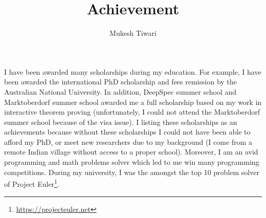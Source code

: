 \documentclass[a4paper]{article}
\title{Achievement}
\author{Mukesh Tiwari}
\date{}
\begin{document}
\fontsize{12}{15}
\selectfont
\maketitle


I have been awarded many scholarships during my education. For example, 
I have been awarded the international PhD scholarship and fees remission by the Australian 
National University. In addition, DeepSpec summer school and Marktoberdorf 
summer school awarded me a full scholarship based on my work in interactive 
theorem proving (unfortunately, I could not attend the Marktoberdorf summer school 
because of the visa issue). I listing these scholarships as an achievements 
because without these scholarships I could not have been able to afford my PhD, or meet 
new researchers due to my background (I come from a remote Indian village without 
access to a proper school). Moreover, I am an avid programming and math problems 
solver which led to me win many programming competitions. During my university, 
I was the amongst the top 10 problem solver of Project 
Euler\footnote{\url{https://projecteuler.net}}. 
\end{document}
